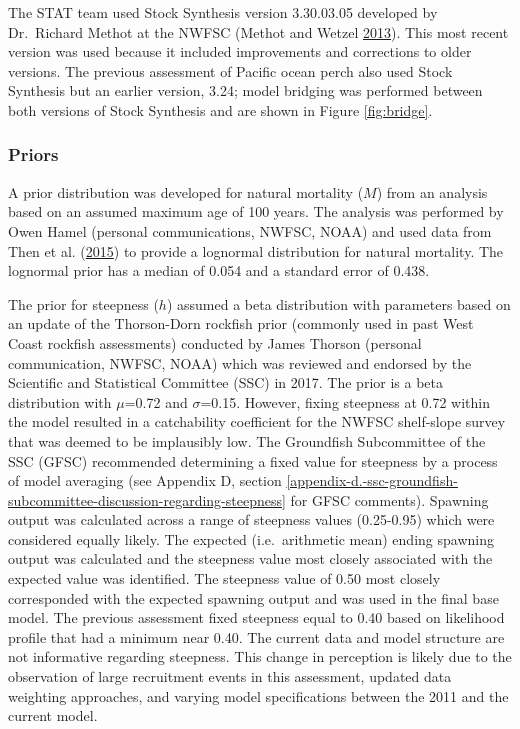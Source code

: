 \documentclass[12pt,]{article}
\begin{document}
The STAT team used Stock Synthesis version 3.30.03.05 developed by
Dr.~Richard Methot at the NWFSC (Methot and Wetzel
\protect\hyperlink{ref-methot_stock_2013}{2013}). This most recent
version was used because it included improvements and corrections to
older versions. The previous assessment of Pacific ocean perch also used
Stock Synthesis but an earlier version, 3.24; model bridging was
performed between both versions of Stock Synthesis and are shown in
Figure \ref{fig:bridge}.

\subsubsection{Priors}\label{priors}

A prior distribution was developed for natural mortality (\(M\)) from an
analysis based on an assumed maximum age of 100 years. The analysis was
performed by Owen Hamel (personal communications, NWFSC, NOAA) and used
data from Then et al.
(\protect\hyperlink{ref-then_evaluating_2015}{2015}) to provide a
lognormal distribution for natural mortality. The lognormal prior has a
median of 0.054 and a standard error of 0.438.

The prior for steepness (\(h\)) assumed a beta distribution with
parameters based on an update of the Thorson-Dorn rockfish prior
(commonly used in past West Coast rockfish assessments) conducted by
James Thorson (personal communication, NWFSC, NOAA) which was reviewed
and endorsed by the Scientific and Statistical Committee (SSC) in 2017.
The prior is a beta distribution with \(\mu\)=0.72 and \(\sigma\)=0.15.
However, fixing steepness at 0.72 within the model resulted in a
catchability coefficient for the NWFSC shelf-slope survey that was
deemed to be implausibly low. The Groundfish Subcommittee of the SSC
(GFSC) recommended determining a fixed value for steepness by a process
of model averaging (see Appendix D, section
\ref{appendix-d.-ssc-groundfish-subcommittee-discussion-regarding-steepness}
for GFSC comments). Spawning output was calculated across a range of
steepness values (0.25-0.95) which were considered equally likely. The
expected (i.e.~arithmetic mean) ending spawning output was calculated
and the steepness value most closely associated with the expected value
was identified. The steepness value of 0.50 most closely corresponded
with the expected spawning output and was used in the final base model.
The previous assessment fixed steepness equal to 0.40 based on
likelihood profile that had a minimum near 0.40. The current data and
model structure are not informative regarding steepness. This change in
perception is likely due to the observation of large recruitment events
in this assessment, updated data weighting approaches, and varying model
specifications between the 2011 and the current model.
\end{document}
